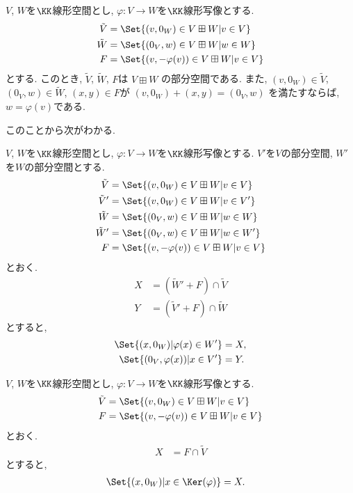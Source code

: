 \begin{prop}
  \label{prop:linmap:calc:elm}
  $V$, $W$を$\KK$線形空間とし,
  $\varphi\colon V\to W$を$\KK$線形写像とする.
  \begin{align*}
    \tilde V &=\Set{(v,0_W)\in V\boxplus W|v\in V}\\
    \tilde W &=\Set{(0_V,w)\in V\boxplus W|w\in W}\\
    F&=\Set{(v,-\varphi(v))\in V\boxplus W|v\in V}
  \end{align*}
  とする.
  このとき,
  $\tilde V$,
  $\tilde W$,
  $F$は
  $V\boxplus W$
  の部分空間である.
  また,
  $(v,0_W)\in \tilde V$,
  $(0_V,w)\in\tilde W$,
  $(x,y)\in F$が
  $(v,0_W)+(x,y)=(0_V,w)$
  を満たすならば,
  $w=\varphi(v)$である.
\end{prop}
このことから次がわかる.
\begin{prop}
  \label{prop:linmap:calc:img}
  $V$, $W$を$\KK$線形空間とし,
  $\varphi\colon V\to W$を$\KK$線形写像とする.
  $V'$を$V$の部分空間,
  $W'$を$W$の部分空間とする.
  \begin{align*}
    \tilde V &=\Set{(v,0_W)\in V\boxplus W|v\in V}\\
    \tilde V' &=\Set{(v,0_W)\in V\boxplus W|v\in V'}\\
    \tilde W &=\Set{(0_V,w)\in V\boxplus W|w\in W}\\
    \tilde W' &=\Set{(0_V,w)\in V\boxplus W|w\in W'}\\
    F&=\Set{(v,-\varphi(v))\in V\boxplus W|v\in V}
  \end{align*}
  とおく.
  \begin{align*}
    X&=(\tilde W'+F)\cap \tilde V\\
    Y&=(\tilde V'+F)\cap \tilde W
  \end{align*}
  とすると,
  \begin{align*}
    \Set{(x,0_W)|\varphi(x)\in W'}&=X,\\
    \Set{(0_V,\varphi(x))|x\in V'}&=Y.
  \end{align*}
\end{prop}
\begin{cor}
  $V$, $W$を$\KK$線形空間とし,
  $\varphi\colon V\to W$を$\KK$線形写像とする.
  \begin{align*}
    \tilde V &=\Set{(v,0_W)\in V\boxplus W|v\in V}\\
    F&=\Set{(v,-\varphi(v))\in V\boxplus W|v\in V}
  \end{align*}
  とおく.
  \begin{align*}
    X&=F\cap \tilde V
  \end{align*}
  とすると,
  \begin{align*}
    \Set{(x,0_W)|x\in\Ker(\varphi)}&=X.
  \end{align*}
\end{cor}
